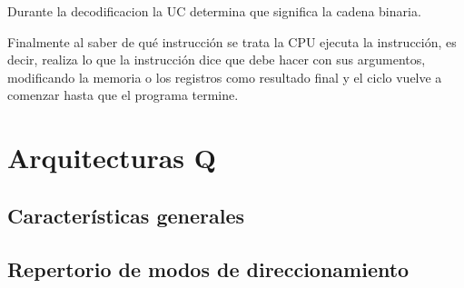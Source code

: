 Durante la decodificacion la UC determina que significa la cadena binaria.

Finalmente al saber de qué instrucción se trata la CPU ejecuta la instrucción, es decir, realiza lo que la instrucción dice que debe hacer con sus argumentos, modificando la memoria o los registros como resultado final y el ciclo vuelve a comenzar hasta que el programa termine.

\section{Arquitecturas Q}

\subsection{Características generales} \label{caracteristicasQ}

\subsection{Repertorio de modos de direccionamiento}

